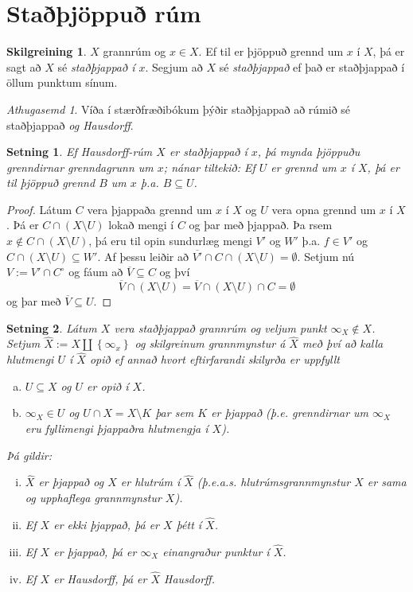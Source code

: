 \documentclass[a4paper,icelandic]{book}
\theoremstyle{definition}
\newtheorem{skilgr}{Skilgreining}[section]
\theoremstyle{plain}
\newtheorem{setn}{Setning}[section]
\theoremstyle{remark}
\newtheorem*{ath}{Athugasemd}
\begin{document}
\section{Staðþjöppuð rúm}
\begin{skilgr}
  $X$ grannrúm og $x\in X$. Ef til er þjöppuð grennd um $x$ í $X$, þá er
  sagt að $X$ sé \emph{staðþjappað í $x$}. Segjum að
  $X$ sé \emph{staðþjappað} ef það er staðþjappað í öllum punktum sínum.
\end{skilgr}
\begin{ath}
  Víða í stærðfræðibókum þýðir staðþjappað að rúmið sé staðþjappað 
  \emph{og Hausdorff}.
\end{ath}
\begin{setn}
  Ef Hausdorff-rúm $X$ er staðþjappað í $x$, þá mynda þjöppuðu
  grenndirnar grenndagrunn um $x$; nánar tiltekið: Ef $U$ er grennd um
  $x$ í $X$, þá er til þjöppuð grennd $B$ um $x$ þ.a. $B\subseteq U$.
\end{setn}
\begin{proof}
  Látum $C$ vera þjappaða grennd um $x$ í $X$ og $U$ vera opna grennd um
  $x$ í $X$. Þá er $C\cap(X\setminus U)$ lokað mengi í $C$ og þar með
  þjappað. Þa rsem $x\notin C\cap(X\setminus U)$, þá eru til opin
  sundurlæg mengi $V'$ og $W'$ þ.a. $f\in V'$ og $C\cap(X\setminus
  U)\subseteq W'$. Af þessu leiðir að $\overline{V'}\cap C\cap
  (X\setminus U) = \emptyset$. Setjum nú $V := V'\cap C^\circ$ og fáum
  að $\overline V\subseteq C$ og því \[
  \overline V\cap (X\setminus U) 
  = \overline V \cap (X\setminus U)\cap C
  = \emptyset
  \]
  og þar með $\overline V \subseteq U$.
\end{proof}
\begin{setn}
  Látum $X$ vera staðþjappað grannrúm og veljum punkt $\infty_X\notin
  X$. Setjum $\hat{X}:=X\coprod\left\{ \infty_x \right\}$ og skilgreinum
  grannmynstur á $\hat X$ með því að kalla hlutmengi $U$ í $\hat X$
  \emph{opið} ef annað hvort eftirfarandi skilyrða er uppfyllt
  \begin{enumerate}[(a)]
    \item $U\subseteq X$ og $U$ er opið í $X$.
    \item $\infty_X\in U$ og $U\cap X = X\setminus K$ þar sem $K$ er
      þjappað (þ.e. grenndirnar um $\infty_X$ eru fyllimengi þjappaðra
      hlutmengja í $X$).
  \end{enumerate}
  Þá gildir:
  \begin{enumerate}[(i)]
    \item $\hat X$ er þjappað og $X$ er hlutrúm í $\hat X$ (þ.e.a.s.
      hlutrúmsgrannmynstur $X$ er sama og upphaflega grannmynstur $X$).
    \item Ef $X$ er ekki þjappað, þá er $X$ þétt í $\hat X$.
    \item Ef $X$ er þjappað, þá er $\infty_X$ einangraður punktur í
      $\hat X$.
    \item Ef $X$ er Hausdorff, þá er $\hat X$ Hausdorff. 
  \end{enumerate}
\end{setn}
\end{document}
